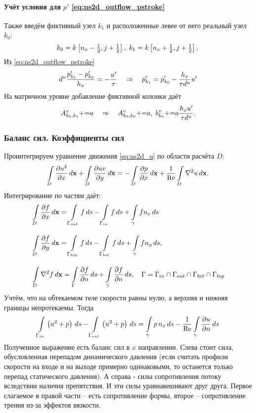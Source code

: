 \paragraph{Учёт условия для $p'$ \cref{eq:ns2d_outflow_pstroke}}
Также введём фиктивный узел $k_1$ и расположенные левее от него реальный узел $k_0$:
\begin{equation*}
k_0 = k\left[n_x - \tfrac12, j+\tfrac12\right], \; k_1 = k\left[n_x + \tfrac12, j+\tfrac12 \right], \\
\end{equation*}
Из \cref{eq:ns2d_outflow_pstroke}
\begin{equation*}
d^u \frac{p'_{k_1} - p'_{k_0}}{h_x} = -\frac{u'}{\tau} \hence p'_{k_1} = p'_{k_0} -\frac{h_x}{\tau d^u} u'
\end{equation*}
На матричном уровне добавление фиктивной колонки даёт
\begin{equation}
\label{eq:ns2d_outflow_pstrike_mat}
A^v_{k_0, k_1} \pluseq a \hence A^v_{k_0, k_0} \pluseq a, \; b^v_{k_0} \pluseq a \frac{h_x u'}{\tau d^u}.
\end{equation}

\subsubsection{Баланс сил. Коэффициенты сил}

Проинтегрируем уравнение движения 
\cref{eq:ns2d_u}
по области расчёта $D$:
$$
\arint{\dfr{u^2}{x}}{D}{\vec x} +
\arint{\dfr{uv}{y}}{D}{\vec x} =
-\arint{\dfr{p}{x}}{D}{\vec x} + \frac{1}{\Ren} \arint{\nabla^2 u}{D}{\vec x}.
$$
Интегрирование по частям даёт:
\begin{align*}
&\arint{\dfr{f}{x}}{D}{\vec x} = \arint{f}{\Gamma_{out}}{s} - \arint{f}{\Gamma_{in}}{s} + \arint{f n_x}{\gamma}{s} \\[10pt]
&\arint{\dfr{f}{y}}{D}{\vec x} = \arint{f}{\Gamma_{top}}{s} - \arint{f}{\Gamma_{bot}}{s}+ \arint{f n_y}{\gamma}{s}, \\[10pt]
&\arint{\nabla^2 f}{D}{\vec x} = \arint{\dfr{f}{n}}{\Gamma}{s} + \arint{\dfr{f}{n}}{\gamma}{s}, \quad \Gamma = \Gamma_{in} \cap \Gamma_{out} \cap \Gamma_{bot} \cap \Gamma_{top}
\end{align*}
Учтём, что на обтекаемом теле скорости равны нулю, а верхняя и нижняя границы непротекаемы.
Тогда
$$
\arint{\left(u^2 + p\right)}{\Gamma_{in}}{s}
-\arint{\left(u^2 + p\right)}{\Gamma_{out}}{s} =
\arint{p \, n_x}{\gamma}{s} - \frac1\Ren\arint{\dfr{u}{n}}{\gamma}{s}
$$
Полученное выражение есть баланс сил в $x$ направлении.
Слева стоит сила, обусловленная перепадом динамического давления
(если считать профили скорости на входе и на выходе примерно одинаковыми, то останется только перепад статического давления).
А справа - силы сопротивления потоку вследствии наличия препятствия. И эти силы уравнавешивают друг друга.
Первое слагаемое в правой части -- есть сопротивление формы, второе -- сопротивление трения из-за эффектов вязкости.

